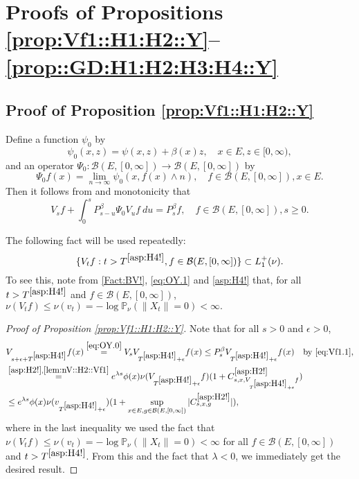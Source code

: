 \documentclass[12pt,a4paper]{amsart}
\numberwithin{equation}{section}
\theoremstyle{plain}
\theoremstyle{definition}
\theoremstyle{remark}
\begin{document}
\section{Proofs of Propositions \ref{prop:Vf1::H1:H2::Y}--\ref{prop::GD:H1:H2:H3:H4::Y}}
\subsection{Proof of Proposition \ref{prop:Vf1::H1:H2::Y}} \label{sec:Vf1}
	Define a function $\psi_0$ by
\[
	\psi_0(x,z) = \psi(x,z)+ \beta(x) z, \quad x\in E, z\in [0,\infty),
\]	
	and an operator $\Psi_0: \mathcal B(E, [0,\infty]) \to \mathcal B(E,[0,\infty])$ by
\begin{equation}
	\Psi_0 f(x)
	= \lim_{n\to \infty} \psi_0(x,f(x) \wedge n),
	\quad f\in \mathcal B(E,[0,\infty]), x\in E.
\end{equation}
	Then it follows from \cite[Theorem 2.23]{Li2011MeasureValued} and monotonicity that
\begin{equation}\label{eq:Vf1.1}
	V_s f + \int_0^s P_{s-u}^\beta \Psi_0 V_{u} f ~du
	= P_s^\beta f,
	\quad f\in \mathcal B(E,[0,\infty]), s\geq 0.
\end{equation}

	The following fact will be used repeatedly:
\begin{equation} \label{lem:nV::H2::Vf1}
	\{V_tf:t> T^{\eqref{asp:H4!}}, f\in \mathcal B(E, [0,\infty])\}\subset L_1^+(\nu).
\end{equation}
	To see this, note from \eqref{Fact:BV!}, \eqref{eq:OY.1} and \eqref{asp:H4!} that, for  all $t> T^{\eqref{asp:H4!}}$ and $f\in \mathcal B(E,[0,\infty])$, $\nu(V_t f) \leq \nu(v_t)   = - \log \mathbb P_\nu (\|X_t\| = 0)  < \infty. $

\begin{proof}[{Proof of Proposition \ref{prop:Vf1::H1:H2::Y}}]
	Note that for all $s>0$ and $\epsilon>0$,
\begin{align}
	& V_{s+\epsilon +T^{\eqref{asp:H4!}}} f (x)
	\overset{\eqref{eq:OY.0}}= V_s V_{T^{\eqref{asp:H4!}}+\epsilon} f(x)
	\leq P_s^\beta V_{T^{\eqref{asp:H4!}} + \epsilon} f(x)\quad\text{by \eqref{eq:Vf1.1}},
 	\\ \label{eq:Vf1.2} & \overset{\eqref{asp:H2!},\eqref{lem:nV::H2::Vf1}}= e^{\lambda s}\phi(x) \nu( V_{T^{\eqref{asp:H4!}} +\epsilon} f)  (1+ C^{\eqref{asp:H2!}}_{s,x,V_{T^{\eqref{asp:H4!}} + \epsilon} f})
	\\&\leq e^{\lambda s}\phi(x) \nu(v_{T^{\eqref{asp:H4!}} +\epsilon})  (1+ \sup_{x\in E, g\in \mathcal B(E,[0,\infty])}|C^{\eqref{asp:H2!}}_{s,x,g}|),
\end{align}
	where
	in the last inequality we used the fact that $\nu(V_t f) \leq \nu(v_t)   = - \log \mathbb P_\nu (\|X_t\| = 0)  < \infty$  
	for all  $f\in \mathcal B(E,[0,\infty])$ and $t > T^{\eqref{asp:H4!}}$.
	From this and the fact that $\lambda < 0$, we immediately get the desired result.
\end{proof}
\end{document}
